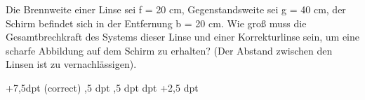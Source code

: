 \documentclass[11pt]{exam}
\begin{document}
\begin{questions}
\vspace{3mm}\question Die Brennweite einer Linse sei f = 20 cm, Gegenstandsweite sei g = 40 cm, der Schirm befindet sich in der Entfernung b = 20 cm. Wie groß muss die Gesamtbrechkraft des Systems dieser Linse und einer Korrekturlinse sein, um eine scharfe Abbildung auf dem Schirm zu erhalten? (Der Abstand zwischen den Linsen ist zu vernachlässigen).

\begin{choices}
	\choice +7,5dpt (correct)
	,5 dpt
	,5 dpt
	 dpt
	\choice +2,5 dpt
\end{choices}

\vspace{3mm}\end{questions}
\end{document}
